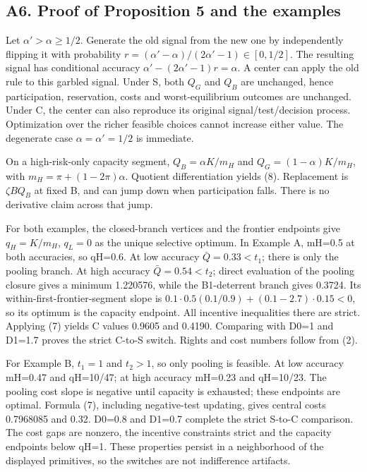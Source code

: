 \documentclass[
  11pt,
]{article}
\begin{document}
\subsection{A6. Proof of Proposition 5 and the
examples}\label{a6.-proof-of-proposition-5-and-the-examples}

Let \(\alpha'>\alpha\geq1/2\). Generate the old signal from the new one
by independently flipping it with probability
\(r=(\alpha'-\alpha)/(2\alpha'-1)\in[0,1/2]\). The resulting signal has
conditional accuracy \(\alpha'-(2\alpha'-1)r=\alpha\). A center can
apply the old rule to this garbled signal. Under S, both \(Q_G\) and
\(Q_B\) are unchanged, hence participation, reservation, costs and
worst-equilibrium outcomes are unchanged. Under C, the center can also
reproduce its original signal/test/decision process. Optimization over
the richer feasible choices cannot increase either value. The degenerate
case \(\alpha=\alpha'=1/2\) is immediate.

On a high-risk-only capacity segment, \(Q_B=\alpha K/m_H\) and
\(Q_G=(1-\alpha)K/m_H\), with \(m_H=\pi+(1-2\pi)\alpha\). Quotient
differentiation yields (8). Replacement is \(\zeta BQ_B\) at fixed B,
and can jump down when participation falls. There is no derivative claim
across that jump.

For both examples, the closed-branch vertices and the frontier endpoints
give \(q_H=K/m_H\), \(q_L=0\) as the unique selective optimum. In
Example A, mH=0.5 at both accuracies, so qH=0.6. At low accuracy
\(\bar Q=0.33<t_1\); there is only the pooling branch. At high accuracy
\(\bar Q=0.54<t_2\); direct evaluation of the pooling closure gives a
minimum 1.220576, while the B1-deterrent branch gives 0.3724. Its
within-first-frontier-segment slope is
\(0.1\cdot0.5(0.1/0.9)+(0.1-2.7)\cdot0.15<0\), so its optimum is the
capacity endpoint. All incentive inequalities there are strict. Applying
(7) yields C values 0.9605 and 0.4190. Comparing with D0=1 and D1=1.7
proves the strict C-to-S switch. Rights and cost numbers follow from
(2).

For Example B, \(t_1=1\) and \(t_2>1\), so only pooling is feasible. At
low accuracy mH=0.47 and qH=10/47; at high accuracy mH=0.23 and
qH=10/23. The pooling cost slope is negative until capacity is
exhausted; these endpoints are optimal. Formula (7), including
negative-test updating, gives central costs 0.7968085 and 0.32. D0=0.8
and D1=0.7 complete the strict S-to-C comparison. The cost gaps are
nonzero, the incentive constraints strict and the capacity endpoints
below qH=1. These properties persist in a neighborhood of the displayed
primitives, so the switches are not indifference artifacts.
\end{document}
